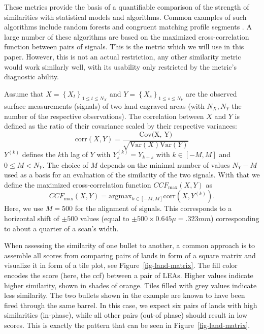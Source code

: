 \documentclass[
  12pt]{article}
\begin{document}
These metrics provide the basis of a quantifiable comparison of the
strength of similarities with statistical models and algorithms. Common
examples of such algorithms include random forests
\citep{hofmannBulletxtrctrAutomaticMatching2022} and congruent matching
profile segments
\citep{chenFiredBulletSignature2019, juOpenSourceImplementationCMPS2022}.
A large number of these algorithms are based on the maximized
cross-correlation function between pairs of signals. This is the metric
which we will use in this paper. However, this is not an actual
restriction, any other similarity metric would work similarly well, with
its usability only restricted by the metric's diagnostic ability.

Assume that \(X = \left\{X_t\right\}_{1 \le t \le N_X}\) and
\(Y = \left\{X_s\right\}_{1 \le s \le N_Y}\) are the observed surface
measurements (signals) of two land engraved areas (with \(N_X, N_Y\) the
number of the respective observations). The correlation between \(X\)
and \(Y\) is defined as the ratio of their covariance scaled by their
respective variances: \[
\text{corr} (X, Y) = \frac{\text{Cov(X, Y)}}{\sqrt{\text{Var}(X) \text{Var}(Y)}}
\] \(Y^{(k)}\) defines the \(k\)th lag of \(Y\) with
\(Y^{(k)}_s = Y_{k+s}\) with \(k \in [-M, M]\) and \(0 \le M < N_Y\).
The choice of \(M\) depends on the minimal number of values \(N_Y-M\)
used as a basis for an evaluation of the similarity of the two signals.
With that we define the maximized cross-correlation function
\(CCF_{\text{max}} (X, Y)\) as \[
CCF_{\text{max}} (X, Y) = \text{arg} \text{max}_{k \in [-M, M]} \text{corr}(X, Y^{(k)}).
\] Here, we use \(M=500\) for the alignment of signals. This corresponds
to a horizontal shift of \(\pm 500\) values (equal to
\(\pm 500 \times 0.645 \mu = .323 mm\)) corresponding to about a quarter
of a scan's width.

When assessing the similarity of one bullet to another, a common
approach is to assemble all scores from comparing pairs of lands in form
of a square matrix and visualize it in form of a tile plot, see
Figure~\ref{fig-land-matrix}. The fill color encodes the score (here,
the ccf) between a pair of LEAs. Higher values indicate higher
similarity, shown in shades of orange. Tiles filled with grey values
indicate less similarity. The two bullets shown in the example are known
to have been fired through the same barrel. In this case, we expect six
pairs of lands with high similarities (in-phase), while all other pairs
(out-of phase) should result in low scores. This is exactly the pattern
that can be seen in Figure~\ref{fig-land-matrix}.
\end{document}
